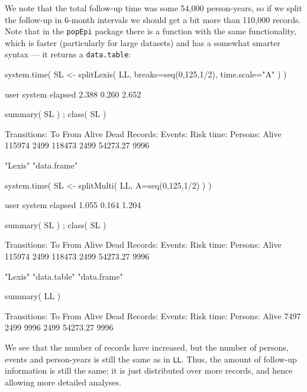 \begin{enumerate}
  We note that the total follow-up time was some 54,000 person-years,
  so if we split the follow-up in 6-month intervals we should get a
  bit more than 110,000 records. Note that in the \texttt{popEpi}
  package there is a function with the same functionality, which is
  faster (particularly for large datasets) and has a somewhat smarter
  syntax --- it returns a \texttt{data.table}:
\begin{Schunk}
\begin{Sinput}
 system.time( SL <- splitLexis( LL, breaks=seq(0,125,1/2), time.scale="A" ) )
\end{Sinput}
\begin{Soutput}
   user  system elapsed 
  2.388   0.260   2.652 
\end{Soutput}
\begin{Sinput}
 summary( SL ) ; class( SL )
\end{Sinput}
\begin{Soutput}
Transitions:
     To
From     Alive Dead  Records:  Events: Risk time:  Persons:
  Alive 115974 2499    118473     2499   54273.27      9996
\end{Soutput}
\begin{Soutput}
[1] "Lexis"      "data.frame"
\end{Soutput}
\begin{Sinput}
 system.time( SL <- splitMulti( LL, A=seq(0,125,1/2) ) )
\end{Sinput}
\begin{Soutput}
   user  system elapsed 
  1.055   0.164   1.204 
\end{Soutput}
\begin{Sinput}
 summary( SL ) ; class( SL )
\end{Sinput}
\begin{Soutput}
Transitions:
     To
From     Alive Dead  Records:  Events: Risk time:  Persons:
  Alive 115974 2499    118473     2499   54273.27      9996
\end{Soutput}
\begin{Soutput}
[1] "Lexis"      "data.table" "data.frame"
\end{Soutput}
\begin{Sinput}
 summary( LL )
\end{Sinput}
\begin{Soutput}
Transitions:
     To
From    Alive Dead  Records:  Events: Risk time:  Persons:
  Alive  7497 2499      9996     2499   54273.27      9996
\end{Soutput}
\end{Schunk}
  We see that the number of records have increased, but the number of
  persons, events and person-years is still the same as in
  \texttt{LL}. Thus, the amount of follow-up information is still the
  same; it is just distributed over more records, and hence allowing
  more detailed analyses. 

\end{enumerate}

